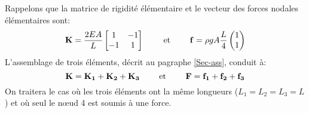 Rappelons que la matrice de rigidité élémentaire et le vecteur des forces nodales élémentaires sont:
\begin{equation} \MM{K} = \frac{2EA}L \begin{bmatrix} 1 & -1\\ -1& 1 \end{bmatrix} %
\qquad \text{ et } \qquad
\VV{f} = \rho g A \frac{L}4 \begin{pmatrix} 1 \\1 \end{pmatrix} \end{equation}
\medskipvm
L'assemblage de trois éléments, décrit au pagraphe \ref{Sec-ass}, conduit à:
\begin{equation} \mathbf{K}=\mathbf{K_1}+\mathbf{K_2}+\mathbf{K_3} \qquad \text{ et } \qquad \mathbf{F}=\mathbf{f_1}+\mathbf{f_2}+\mathbf{f_3} \end{equation}
\medskipvm
On traitera le cas où les trois éléments ont la même longueurs ($L_1=L_2=L_3=L$) et où seul le nœud 4 est
soumis à une force.

